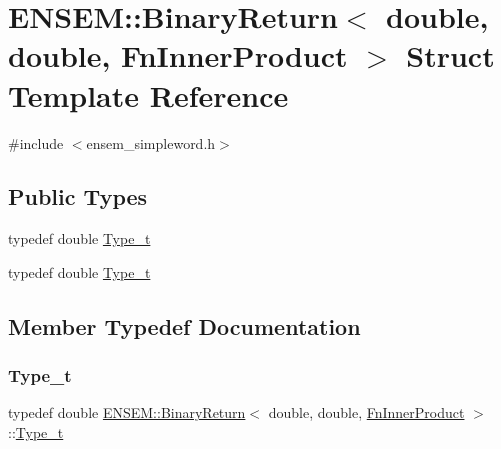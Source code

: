 \hypertarget{structENSEM_1_1BinaryReturn_3_01double_00_01double_00_01FnInnerProduct_01_4}{}\section{E\+N\+S\+EM\+:\+:Binary\+Return$<$ double, double, Fn\+Inner\+Product $>$ Struct Template Reference}
\label{structENSEM_1_1BinaryReturn_3_01double_00_01double_00_01FnInnerProduct_01_4}


{\ttfamily \#include $<$ensem\+\_\+simpleword.\+h$>$}

\subsection*{Public Types}
\begin{DoxyCompactItemize}
\item 
typedef double \mbox{\hyperlink{structENSEM_1_1BinaryReturn_3_01double_00_01double_00_01FnInnerProduct_01_4_ad70792f5fdfdd15bfa202a4282cb068b}{Type\+\_\+t}}
\item 
typedef double \mbox{\hyperlink{structENSEM_1_1BinaryReturn_3_01double_00_01double_00_01FnInnerProduct_01_4_ad70792f5fdfdd15bfa202a4282cb068b}{Type\+\_\+t}}
\end{DoxyCompactItemize}


\subsection{Member Typedef Documentation}
\mbox{\label{structENSEM_1_1BinaryReturn_3_01double_00_01double_00_01FnInnerProduct_01_4_ad70792f5fdfdd15bfa202a4282cb068b}} 
\subsubsection{\texorpdfstring{Type\_t}{Type\_t}\hspace{0.1cm}{\footnotesize\ttfamily [1/2]}}
{\footnotesize\ttfamily typedef double \mbox{\hyperlink{structENSEM_1_1BinaryReturn}{E\+N\+S\+E\+M\+::\+Binary\+Return}}$<$ double, double, \mbox{\hyperlink{structENSEM_1_1FnInnerProduct}{Fn\+Inner\+Product}} $>$\+::\mbox{\hyperlink{structENSEM_1_1BinaryReturn_3_01double_00_01double_00_01FnInnerProduct_01_4_ad70792f5fdfdd15bfa202a4282cb068b}{Type\+\_\+t}}}

